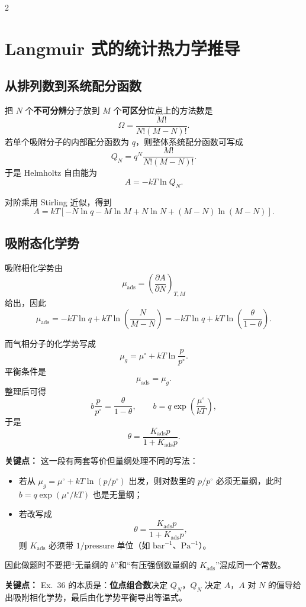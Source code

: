 \documentclass[a4paper,9pt]{article}
\newenvironment{keypoint}
{\par\vspace{0.3em}\noindent\begin{tcolorbox}[colback=keybg,colframe=keycolor,boxrule=0.5pt,arc=2pt,left=2pt,right=2pt,top=2pt,bottom=2pt,boxsep=0pt]\noindent\textcolor{keycolor}{\textbf{关键点：}}}
{\end{tcolorbox}\par\vspace{0.3em}}
\begin{document}
\begin{multicols}{2}
\section{Langmuir 式的统计热力学推导}

\subsection{从排列数到系统配分函数}
把 $N$ 个\textbf{不可分辨}分子放到 $M$ 个\textbf{可区分}位点上的方法数是
\[
\Omega=\frac{M!}{N!(M-N)!}.
\]
若单个吸附分子的内部配分函数为 $q$，则整体系统配分函数可写成
\[
Q_N=q^N\frac{M!}{N!(M-N)!}.
\]
于是 Helmholtz 自由能为
\[
A=-kT\ln Q_N.
\]

对阶乘用 Stirling 近似，得到
\[
A=kT\left[-N\ln q-M\ln M+N\ln N+(M-N)\ln(M-N)\right].
\]

\subsection{吸附态化学势}
吸附相化学势由
\[
\mu_{\mathrm{ads}}=\left(\frac{\partial A}{\partial N}\right)_{T,M}
\]
给出，因此
\[
\mu_{\mathrm{ads}}=-kT\ln q+kT\ln\left(\frac{N}{M-N}\right)
=-kT\ln q+kT\ln\left(\frac{\theta}{1-\theta}\right).
\]

而气相分子的化学势写成
\[
\mu_g=\mu^\circ+kT\ln\frac{p}{p^\circ}.
\]
平衡条件是
\[
\mu_{\mathrm{ads}}=\mu_g.
\]
整理后可得
\[
b\frac{p}{p^\circ}=\frac{\theta}{1-\theta},
\qquad
b=q\exp\left(\frac{\mu^\circ}{kT}\right),
\]
于是
\[
	\theta=\frac{K_{\mathrm{ads}}p}{1+K_{\mathrm{ads}}p}.
\]

\begin{keypoint}
	这一段有两套等价但量纲处理不同的写法：
	\begin{itemize}
		\item 若从 $\mu_g=\mu^\circ+kT\ln(p/p^\circ)$ 出发，则对数里的 $p/p^\circ$ 必须无量纲，此时 $b=q\exp(\mu^\circ/kT)$ 也是无量纲；
		\item 若改写成
		\[
			\theta=\frac{K_{\mathrm{ads}}p}{1+K_{\mathrm{ads}}p},
		\]
		则 $K_{\mathrm{ads}}$ 必须带 $1/\text{pressure}$ 单位（如 $\mathrm{bar^{-1}}$、$\mathrm{Pa^{-1}}$）。
	\end{itemize}
	因此做题时不要把“无量纲的 $b$”和“有压强倒数量纲的 $K_{\mathrm{ads}}$”混成同一个常数。
\end{keypoint}

\begin{keypoint}
	Ex.~36 的本质是：\textbf{位点组合数}决定 $Q_N$，$Q_N$ 决定 $A$，$A$ 对 $N$ 的偏导给出吸附相化学势，最后由化学势平衡导出等温式。
\end{keypoint}


\end{multicols}
\end{document}
